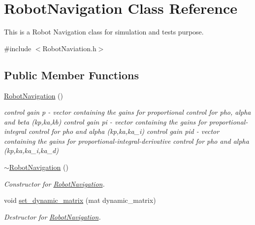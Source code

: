 \hypertarget{class_robot_navigation}{}\section{Robot\+Navigation Class Reference}
\label{class_robot_navigation}


This is a Robot Navigation class for simulation and tests purpose.  




{\ttfamily \#include $<$Robot\+Naviation.\+h$>$}

\subsection*{Public Member Functions}
\begin{DoxyCompactItemize}
\item 
\mbox{\label{class_robot_navigation_a949517ad58b54558b5e97fb7154f185b}} 
\hyperlink{class_robot_navigation_a949517ad58b54558b5e97fb7154f185b}{Robot\+Navigation} ()
\begin{DoxyCompactList}\small\item\em control gain p -\/ vector containing the gains for proportional control for pho, alpha and beta (kp,ka,kb) control gain pi -\/ vector containing the gains for proportional-\/integral control for pho and alpha (kp,ka,ka\+\_\+i) control gain pid -\/ vector containing the gains for proportional-\/integral-\/derivative control for pho and alpha (kp,ka,ka\+\_\+i,ka\+\_\+d) \end{DoxyCompactList}\item 
\mbox{\label{class_robot_navigation_af29a5bb696c20ee7c8ced94f2c33b893}} 
\hyperlink{class_robot_navigation_af29a5bb696c20ee7c8ced94f2c33b893}{$\sim$\+Robot\+Navigation} ()
\begin{DoxyCompactList}\small\item\em Constructor for \hyperlink{class_robot_navigation}{Robot\+Navigation}. \end{DoxyCompactList}\item 
\mbox{\label{class_robot_navigation_aaed78c0f698c9f29760979b654caa162}} 
void \hyperlink{class_robot_navigation_aaed78c0f698c9f29760979b654caa162}{set\+\_\+dynamic\+\_\+matrix} (mat dynamic\+\_\+matrix)
\begin{DoxyCompactList}\small\item\em Destructor for \hyperlink{class_robot_navigation}{Robot\+Navigation}. \end{DoxyCompactList}\item 

\end{DoxyCompactItemize}
